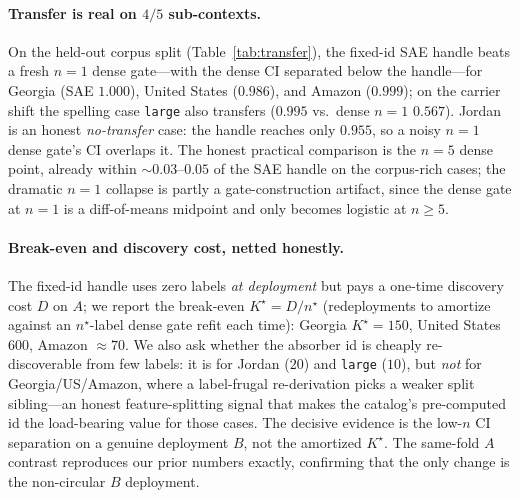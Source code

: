 \documentclass[11pt,letterpaper]{article}
\begin{document}
\paragraph{Transfer is real on $4/5$ sub-contexts.} On the held-out corpus split (Table~\ref{tab:transfer}), the fixed-id SAE handle beats a fresh $n{=}1$ dense gate---with the dense CI separated below the handle---for Georgia (SAE $1.000$), United States ($0.986$), and Amazon ($0.999$); on the carrier shift the spelling case \texttt{large} also transfers ($0.995$ vs.\ dense $n{=}1$ $0.567$). Jordan is an honest \emph{no-transfer} case: the handle reaches only $0.955$, so a noisy $n{=}1$ dense gate's CI overlaps it. The honest practical comparison is the $n{=}5$ dense point, already within $\sim0.03$--$0.05$ of the SAE handle on the corpus-rich cases; the dramatic $n{=}1$ collapse is partly a gate-construction artifact, since the dense gate at $n{=}1$ is a diff-of-means midpoint and only becomes logistic at $n\ge5$.

\paragraph{Break-even and discovery cost, netted honestly.} The fixed-id handle uses zero labels \emph{at deployment} but pays a one-time discovery cost $D$ on $A$; we report the break-even $K^\star=D/n^\star$ (redeployments to amortize against an $n^\star$-label dense gate refit each time): Georgia $K^\star{=}150$, United States $600$, Amazon $\approx70$. We also ask whether the absorber id is cheaply re-discoverable from few labels: it is for Jordan ($20$) and \texttt{large} ($10$), but \emph{not} for Georgia/US/Amazon, where a label-frugal re-derivation picks a weaker split sibling---an honest feature-splitting signal that makes the catalog's pre-computed id the load-bearing value for those cases. The decisive evidence is the low-$n$ CI separation on a genuine deployment $B$, not the amortized $K^\star$. The same-fold $A$ contrast reproduces our prior numbers exactly, confirming that the only change is the non-circular $B$ deployment.
\end{document}
